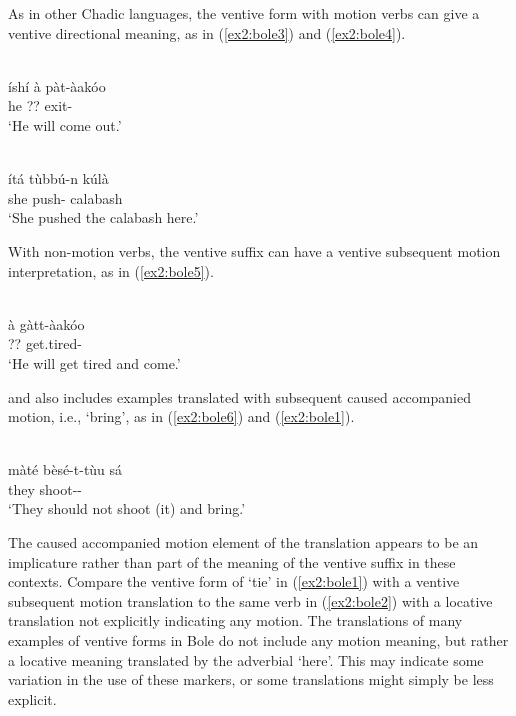 As in other Chadic languages, the ventive form with motion verbs can give a ventive directional meaning, as in (\ref{ex2:bole3}) and (\ref{ex2:bole4}).

\ea\label{ex2:bole3}
 \\
\gll íshí	à	pàt-àakóo \\
he	??	exit- \\
\glt `He will come out.'

\ex\label{ex2:bole4}
 \\
\gll ítá	tùbbú-n	kúlà \\
she	push-	calabash \\
\glt `She pushed the calabash here.'
\z 

With non-motion verbs, the ventive suffix can have a ventive subsequent motion interpretation, as in (\ref{ex2:bole5}). 

\ea\label{ex2:bole5}
 \\
\gll à gàtt-àakóo \\
?? get.tired- \\
\glt `He will get tired and come.'
\z 

\citet{gimbaBoleVerbMorphology2000} and \citet{schuhBoleReferenceGrammar2005} also includes examples translated with subsequent caused accompanied motion, i.e., `bring', as in (\ref{ex2:bole6}) and (\ref{ex2:bole1}). 

\ea\label{ex2:bole6}
 \\
\gll màté	bèsé-t-tùu	sá \\
they	shoot--	 \\
\glt `They should not shoot (it) and bring.'
\z

The caused accompanied motion element of the translation appears to be an implicature rather than part of the meaning of the ventive suffix in these contexts. Compare the ventive form of ‘tie’ in (\ref{ex2:bole1}) with a ventive subsequent motion translation to the same verb in (\ref{ex2:bole2}) with a locative translation not explicitly indicating any motion. The translations of many examples of ventive forms in Bole do not include any motion meaning, but rather a locative meaning translated by the adverbial `here'. This may indicate some variation in the use of these markers, or some translations might simply be less explicit. 

